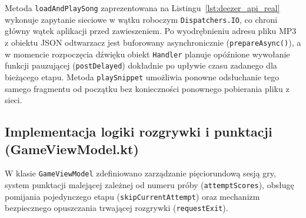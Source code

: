 \hspace{0.60cm}Metoda \texttt{loadAndPlaySong} zaprezentowana na Listingu~\ref{lst:deezer_api_real} wykonuje zapytanie sieciowe w wątku roboczym \texttt{Dispatchers.IO}, co chroni główny wątek aplikacji przed zawieszeniem. Po wyodrębnieniu adresu pliku MP3 z obiektu JSON odtwarzacz jest buforowany asynchronicznie (\texttt{prepareAsync()}), a w momencie rozpoczęcia dźwięku obiekt \texttt{Handler} planuje opóźnione wywołanie funkcji pauzującej (\texttt{postDelayed}) dokładnie po upływie czasu zadanego dla bieżącego etapu. Metoda \texttt{playSnippet} umożliwia ponowne odsłuchanie tego samego fragmentu od początku bez konieczności ponownego pobierania pliku z sieci.

\subsection{Implementacja logiki rozgrywki i punktacji (GameViewModel.kt)}

\hspace{0.60cm}W klasie \texttt{GameViewModel} zdefiniowano zarządzanie pięciorundową sesją gry, system punktacji malejącej zależnej od numeru próby (\texttt{attemptScores}), obsługę pomijania pojedynczego etapu (\texttt{skipCurrentAttempt}) oraz mechanizm bezpiecznego opuszczania trwającej rozgrywki (\texttt{requestExit}).


